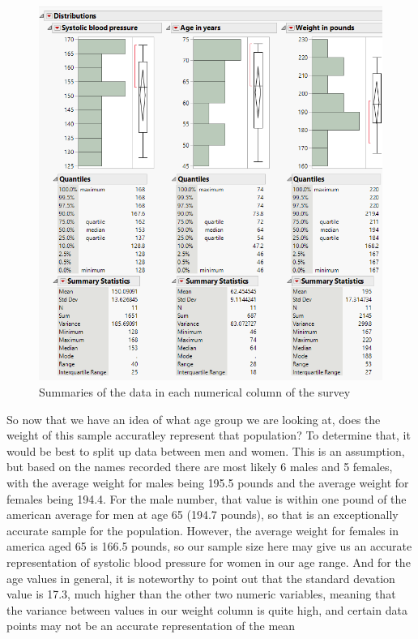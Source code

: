 \documentclass[14pt]{article}
\begin{document}
\begin{enumerate}
\begin{enumerate}[(a)]
\begin{figure}[h]
\includegraphics[scale=0.75]{hw1Pics/NumericalAnalysis.PNG}
\centering
\caption{Summaries of the data in each numerical column of the survey}
\end{figure}

So now that we have an idea of what age group we are looking at, does the weight of this sample accuratley represent that population? To determine that, it would be best to split up data between men and women. This is an assumption, but based on the names recorded there are most likely 6 males and 5 females, with the average weight for males being 195.5 pounds and the average weight for females being 194.4. For the male number, that value is within one pound of the american average for men at age 65 (194.7 pounds), so that is an exceptionally accurate sample for the population. However, the average weight for females in america aged 65 is 166.5 pounds, so our sample size here may give us an accurate representation of systolic blood pressure for women in our age range. And for the age values in general, it is noteworthy to point out that the standard devation value is 17.3, much higher than the other two numeric variables, meaning that the variance between values in our weight column is quite high, and certain data points may not be an accurate representation of the mean  \\


\end{enumerate}
\end{enumerate}
\end{document}
